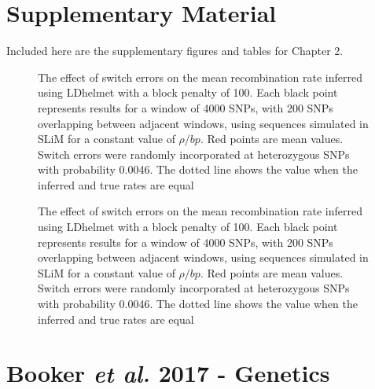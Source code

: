 
\section{Supplementary Material}
Included here are the supplementary figures and tables for Chapter 2.
\linespread{1}




 
 \begin{figure}
   \centering      
   \noindent{}
 \caption[]{}
 \label{fig:1}
\end{figure}

 
 \begin{figure}
   \centering      
   \noindent{}
 \caption[The effect of switch errors on recombination rate inference]{The effect of switch errors on the mean recombination rate inferred using LDhelmet with a block penalty of 100. Each black point represents results for a window of 4000 SNPs, with 200 SNPs overlapping between adjacent windows, using sequences simulated in SLiM for a constant value of $\rho/bp$. Red points are mean values. Switch errors were randomly incorporated at heterozygous SNPs with probability 0.0046. The dotted line shows the value when the inferred and true rates are equal}
 \label{fig:1}
\end{figure}

 
 \begin{figure}
   \centering      
   \noindent{}
 \caption[The effect of switch errors on recombination rate inference]{The effect of switch errors on the mean recombination rate inferred using LDhelmet with a block penalty of 100. Each black point represents results for a window of 4000 SNPs, with 200 SNPs overlapping between adjacent windows, using sequences simulated in SLiM for a constant value of $\rho/bp$. Red points are mean values. Switch errors were randomly incorporated at heterozygous SNPs with probability 0.0046. The dotted line shows the value when the inferred and true rates are equal}
 \label{fig:1}
\end{figure}

\pagebreak
\section{Booker \emph{et al.} 2017 - Genetics}

\linespread{2}
